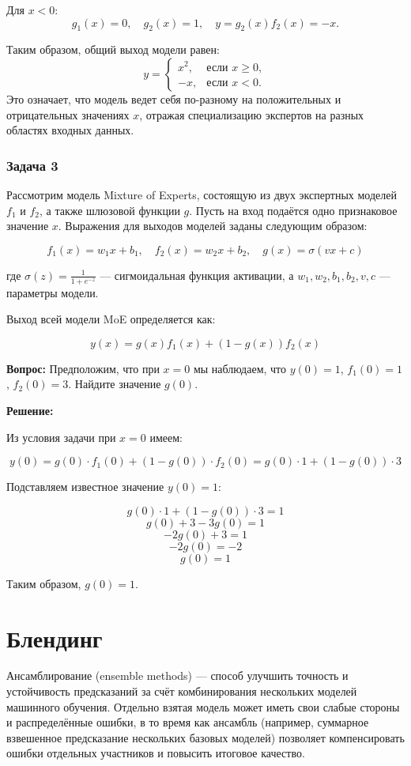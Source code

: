 Для $x < 0$: 
$$
g_1(x) = 0, \quad g_2(x) = 1, \quad y = g_2(x) f_2(x) = -x.
$$

Таким образом, общий выход модели равен:
$$
y = 
\begin{cases} 
x^2, & \text{если } x \geq 0, \\ 
-x, & \text{если } x < 0.
\end{cases}
$$
Это означает, что модель ведет себя по-разному на положительных и отрицательных значениях $x$, отражая специализацию экспертов на разных областях входных данных.

\subsubsection{Задача 3}

Рассмотрим модель Mixture of Experts, состоящую из двух экспертных моделей $f_1$ и $f_2$, а также шлюзовой функции $g$. Пусть на вход подаётся одно признаковое значение $x$. Выражения для выходов моделей заданы следующим образом:

$$
f_1(x) = w_1 x + b_1, \quad f_2(x) = w_2 x + b_2, \quad g(x) = \sigma(v x + c)
$$

где $\sigma(z) = \frac{1}{1 + e^{-z}}$ — сигмоидальная функция активации, а $w_1, w_2, b_1, b_2, v, c$ — параметры модели.

Выход всей модели MoE определяется как:

$$
y(x) = g(x) f_1(x) + (1 - g(x)) f_2(x)
$$

\textbf{Вопрос:} Предположим, что при $x = 0$ мы наблюдаем, что $y(0) = 1$, $f_1(0) = 1$, $f_2(0) = 3$. Найдите значение $g(0)$.

\textbf{Решение:}

Из условия задачи при $x = 0$ имеем:

$$
y(0) = g(0) \cdot f_1(0) + (1 - g(0)) \cdot f_2(0) = g(0) \cdot 1 + (1 - g(0)) \cdot 3
$$

Подставляем известное значение $y(0) = 1$:

$$
g(0) \cdot 1 + (1 - g(0)) \cdot 3 = 1
$$
$$
g(0) + 3 - 3g(0) = 1
$$
$$
-2g(0) + 3 = 1
$$
$$
-2g(0) = -2
$$
$$
g(0) = 1
$$

Таким образом, $g(0) = 1$.

\section{Блендинг}
Ансамблирование (ensemble methods) --- способ улучшить точность и устойчивость предсказаний за счёт комбинирования нескольких моделей машинного обучения. Отдельно взятая модель может иметь свои слабые стороны и распределённые ошибки, в то время как ансамбль (например, суммарное взвешенное предсказание нескольких базовых моделей) позволяет компенсировать ошибки отдельных участников и повысить итоговое качество.

